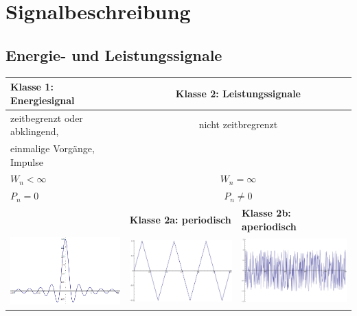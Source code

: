 \section{Signalbeschreibung }
\subsection{Energie- und Leistungssignale }
\begin{tabular}{|l|l|l|}
	\hline
	\textbf{Klasse 1: Energiesignal} & \multicolumn{2}{|c|}{\textbf{Klasse 2: Leistungssignale}} \\
	\hline
	zeitbegrenzt oder abklingend,  	& \multicolumn{2}{|c|}{nicht zeitbregrenzt} \\ 
	einmalige Vorgänge, Impulse		& \multicolumn{2}{|c|}{}\\
	$W_n < \infty$		 	& \multicolumn{2}{|c|}{$W_n = \infty $} \\
	$P_n = 0$				& \multicolumn{2}{|c|}{$P_n \neq 0 $} \\
	\hline
							& \textbf{Klasse 2a: periodisch}	& \textbf{Klasse 2b: aperiodisch} \\
	\hline
	\includegraphics[width=5.9cm]{./bilder/Signale/SinusAbklingend.png} &
	\includegraphics[width=5.9cm]{./bilder/Signale/Dreieck.png} &
	\includegraphics[width=5.9cm]{./bilder/Signale/Noise.png} \\
	\hline
 \end{tabular} \\
